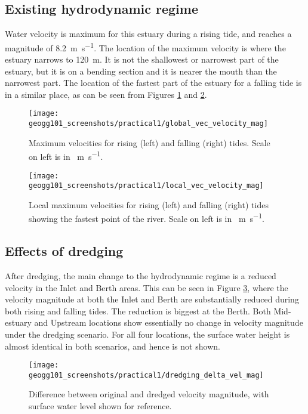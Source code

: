 \documentclass{article}
\begin{document}
\subsection{Existing hydrodynamic regime}

Water velocity is maximum for this estuary during a rising tide, and reaches a magnitude of \SI{8.2}{m.s^{-1}}. The location of the maximum velocity is where the estuary narrows to \SI{120}{m}. It is not the shallowest or narrowest part of the estuary, but it is on a bending section and it is nearer the mouth than the narrowest part. The location of the fastest part of the estuary for a falling tide is in a similar place, as can be seen from Figures \ref{fig:global_velocities} and \ref{fig:local_velocities}.

\begin{figure}[!h]
    \centering
    \texttt{[image: geogg101\_screenshots/practical1/global\_vec\_velocity\_mag]}
    \caption{Maximum velocities for rising (left) and falling (right) tides. Scale on left is in \SI{}{m.s^{-1}}.}
    \label{fig:global_velocities}
\end{figure}

\begin{figure}[!h]
    \centering
    \texttt{[image: geogg101\_screenshots/practical1/local\_vec\_velocity\_mag]}
    \caption{Local maximum velocities for rising (left) and falling (right) tides showing the fastest point of the river. Scale on left is in \SI{}{m.s^{-1}}.}
    \label{fig:local_velocities}
\end{figure}

\subsection{Effects of dredging}

After dredging, the main change to the hydrodynamic regime is a reduced velocity in the Inlet and Berth areas. This can be seen in Figure \ref{fig:dredging_delta_vel_mag}, where the velocity magnitude at both the Inlet and Berth are substantially reduced during both rising and falling tides. The reduction is biggest at the Berth. Both Mid-estuary and Upstream locations show essentially no change in velocity magnitude under the dredging scenario. For all four locations, the surface water height is almost identical in both scenarios, and hence is not shown.

\begin{figure}[!h]
    \centering
    \texttt{[image: geogg101\_screenshots/practical1/dredging\_delta\_vel\_mag]}
    \caption{Difference between original and dredged velocity magnitude, with surface water level shown for reference.}
    \label{fig:dredging_delta_vel_mag}
\end{figure}
\end{document}
